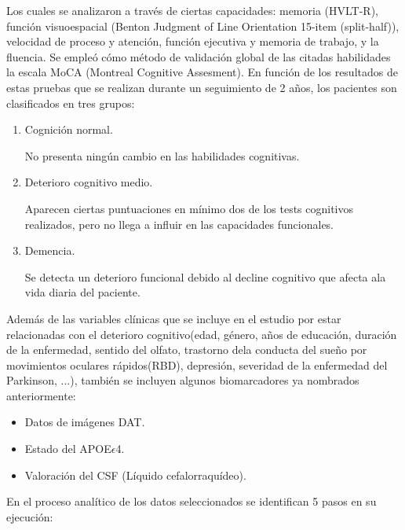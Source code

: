 Los cuales se analizaron a través de ciertas capacidades: memoria (HVLT-R), función visuoespacial (Benton Judgment of Line Orientation 15-item (split-half)), velocidad de proceso y atención, función ejecutiva y memoria de trabajo, y la fluencia. Se empleó cómo método de validación global de las citadas habilidades la escala MoCA (Montreal Cognitive Assesment). En función de los resultados de estas pruebas que se realizan durante un seguimiento de 2 años, los pacientes son clasificados en tres grupos:
\begin{enumerate}
	\item Cognición normal.
	
	No presenta ningún cambio en las habilidades cognitivas.
	
	\item Deterioro cognitivo medio.
	
	Aparecen ciertas puntuaciones en mínimo dos de los tests cognitivos  realizados, pero no llega a influir en las capacidades funcionales.
	
	\item Demencia.	
	
	Se detecta un deterioro funcional debido al decline cognitivo que afecta ala vida diaria del paciente.
\end{enumerate}

Además de las variables clínicas que se incluye en el estudio por estar relacionadas con el deterioro cognitivo(edad, género, años de educación, duración de la enfermedad, sentido del olfato, trastorno dela conducta del sueño por movimientos oculares rápidos(RBD), depresión, severidad de la enfermedad del Parkinson, ...), también se incluyen algunos biomarcadores ya nombrados anteriormente: 
\begin{itemize}
	\item Datos de imágenes DAT.
	\item Estado del APOE$\epsilon$4.
	\item Valoración del CSF (Líquido cefalorraquídeo).
\end{itemize}

En el proceso analítico de los datos seleccionados se identifican 5 pasos en su ejecución:

